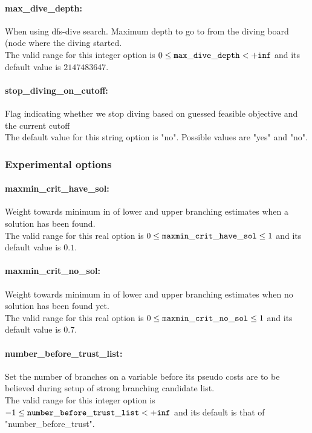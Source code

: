 \paragraph{max\_dive\_depth:} When using dfs-dive search. Maximum depth to go to from the diving board (node where the diving started. $\;$ \\
 The valid range for this integer option is
$0 \le {\tt max\_dive\_depth } <  {\tt +inf}$
and its default value is $2147483647$.


\paragraph{stop\_diving\_on\_cutoff:} Flag indicating whether we stop diving based on guessed feasible objective and the current cutoff $\;$ \\
The default value for this string option is "no". Possible values are "yes" and "no".


\subsubsection{Experimental options}
\label{sec:bonmin_experimental_options}
\paragraph{maxmin\_crit\_have\_sol:} Weight towards minimum in of lower and upper branching estimates when a solution has been found. $\;$ \\
 The valid range for this real option is 
$0 \le {\tt maxmin\_crit\_have\_sol } \le 1$
and its default value is $0.1$.


\paragraph{maxmin\_crit\_no\_sol:} Weight towards minimum in of lower and upper branching estimates when no solution has been found yet. $\;$ \\
 The valid range for this real option is 
$0 \le {\tt maxmin\_crit\_no\_sol } \le 1$
and its default value is $0.7$.


\paragraph{number\_before\_trust\_list:} Set the number of branches on a variable before its pseudo costs are to be believed during setup of strong branching candidate list. $\;$ \\
 The valid range for this integer option is
$-1 \le {\tt number\_before\_trust\_list } <  {\tt +inf}$ and its default is that of "number\_before\_trust".




